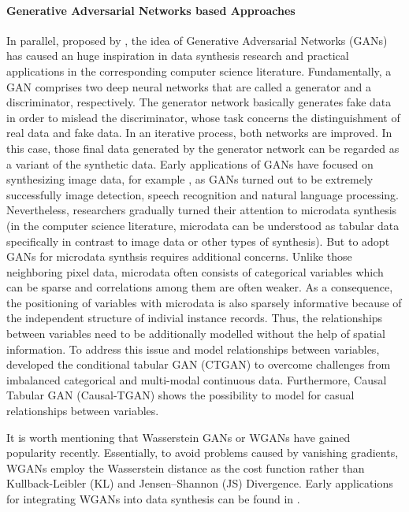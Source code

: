 \paragraph{Generative Adversarial Networks based Approaches}
In parallel, proposed by \citet{goodfellow2020generative}, the idea of Generative Adversarial Networks (GANs) has caused an huge inspiration
in data synthesis research and practical applications in the corresponding computer science literature. Fundamentally, a GAN comprises two deep 
neural networks that are called a generator and a discriminator, respectively. The generator network basically generates fake data in order to
mislead the discriminator, whose task concerns the distinguishment of real data and fake data. In an iterative process, both networks
are improved. In this case, those final data generated by the generator network can be regarded as a variant of the synthetic data.
Early applications of GANs have focused on synthesizing image data, for example \citep{denton2015deep}, as GANs turned out to be extremely
successfully image detection, speech recognition and natural language processing. Nevertheless, researchers gradually turned their attention to
microdata synthesis (in the computer science literature, microdata can be understood as tabular data specifically in contrast to image data or other types of synthesis). 
But to adopt GANs for microdata synthsis requires additional concerns. Unlike those neighboring pixel data, microdata often consists of categorical variables
which can be sparse and correlations among them are often weaker. As a consequence, the positioning of variables with microdata is also
sparsely informative because of the independent structure of indivial instance records. Thus, the relationships between variables need to be 
additionally modelled without the help of spatial information. To address this issue and model relationships between variables, 
\citet*{xu2019modeling} developed the conditional tabular GAN (CTGAN) to overcome challenges from imbalanced categorical and multi-modal continuous data.
Furthermore, Causal Tabular GAN (Causal-TGAN) \citep{wen2021causal} shows the possibility to model for casual relationships between variables.

It is worth mentioning that Wasserstein GANs or WGANs \citep{arjovsky2017wasserstein} have gained popularity recently. Essentially, to avoid problems caused by vanishing gradients, 
WGANs employ the Wasserstein distance as the cost function rather than Kullback-Leibler (KL) and Jensen–Shannon (JS) Divergence. Early applications for integrating WGANs into data synthesis
can be found in \citet{camino2018generating}.
